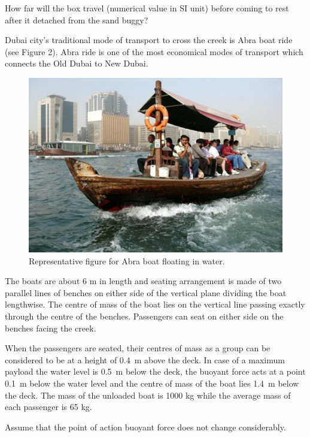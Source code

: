 {\prob
How far will the box travel (numerical value in SI unit) before coming to rest after it detached from the sand buggy?


Dubai city’s traditional mode of transport to cross the creek is Abra boat ride (see Figure 2). Abra ride is one of the most economical modes of transport which connects the Old Dubai to New Dubai.
\begin{figure}[!htbp]
  \centering
  \includegraphics[width=0.7\linewidth]{2021-t-02-p3}
  \caption{Representative figure for Abra boat floating in water. }
\end{figure}


The boats are about 6 m in length and seating arrangement is made of two parallel lines of benches on either side of the vertical plane dividing the boat lengthwise. The centre of mass of the boat lies on the vertical line passing exactly through the centre of the benches. Passengers can seat on either side on the benches facing the creek.

When the passengers are seated, their centres of mass as a group can be considered to be at a height of \SI{0.4}{\m} above the deck. In case of a maximum payload the water level is \SI{0.5}{\m} below the deck, the buoyant force acts at a point \SI{0.1}{\m} below the water level and the centre of mass of the boat lies \SI{1.4}{\m} below the deck. The mass of the unloaded boat is 1000 kg while the average mass of each passenger is 65 kg.

Assume that the point of action buoyant force does not change considerably.

}
